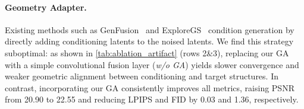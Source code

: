 

\paragraph{Geometry Adapter.} 
Existing methods such as GenFusion~\cite{Wu2025GenFusion} and ExploreGS~\cite{Kim_2025_ExploreGS} condition generation by directly adding conditioning latents to the noised latents. 
We find this strategy suboptimal: as shown in \cref{tab:ablation_artifact} (rows 2\&3), replacing our GA with a simple convolutional fusion layer (\textit{w/o GA}) yields slower convergence and weaker geometric alignment between conditioning and target structures. 
In contrast, incorporating our GA consistently improves all metrics, raising PSNR from 20.90 to 22.55 and reducing LPIPS and FID by 0.03 and 1.36, respectively. 